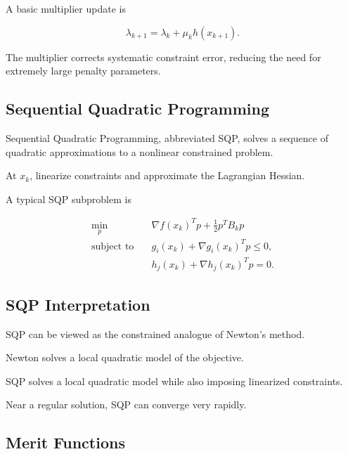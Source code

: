 A basic multiplier update is

\[
\boxed{
\lambda_{k+1}
=
\lambda_k
+
\mu_k
h(x_{k+1}).
}
\]

The multiplier corrects systematic constraint error, reducing the need for
extremely large penalty parameters.

\subsection{Sequential Quadratic Programming}
\label{subsec:numerical-sqp}

Sequential Quadratic Programming, abbreviated SQP, solves a sequence of
quadratic approximations to a nonlinear constrained problem.

At \(x_k\), linearize constraints and approximate the Lagrangian Hessian.

A typical SQP subproblem is

\[
\boxed{
\begin{aligned}
\min_p
\quad&
\nabla f(x_k)^Tp
+
\frac12p^TB_kp
\\
\text{subject to}
\quad&
g_i(x_k)
+
\nabla g_i(x_k)^Tp
\leq0,
\\
&
h_j(x_k)
+
\nabla h_j(x_k)^Tp
=
0.
\end{aligned}
}
\]

\subsection{SQP Interpretation}
\label{subsec:sqp-interpretation}

SQP can be viewed as the constrained analogue of Newton's method.

Newton solves a local quadratic model of the objective.

SQP solves a local quadratic model while also imposing linearized
constraints.

Near a regular solution, SQP can converge very rapidly.

\subsection{Merit Functions}
\label{subsec:optimization-merit-functions}

